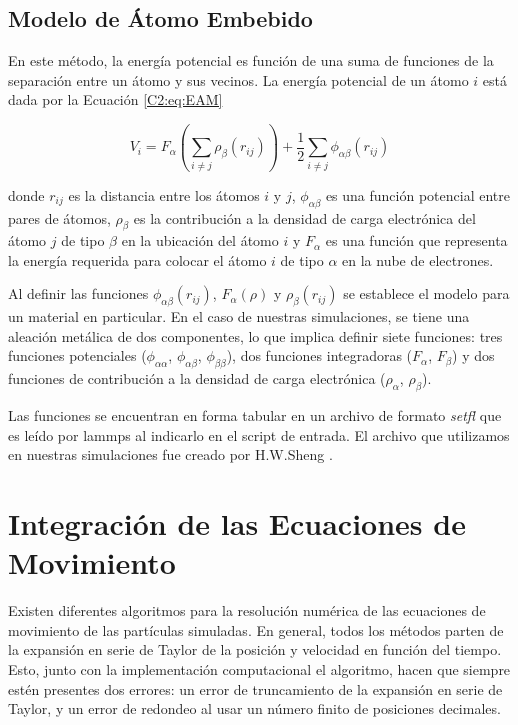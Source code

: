 \subsection{Modelo de Átomo Embebido}
\label{SS2_3_2}

En este método, la energía potencial es función de una suma de funciones de la separación entre un átomo y sus vecinos. La energía potencial de un átomo $i$ está dada por la Ecuación \ref{C2:eq:EAM}

\begin{equation}
V_{i} = F_{\alpha}\left(\sum_{i\neq j} \rho_{\beta} (r_{ij}) \right) + \frac{1}{2} \sum_{i\neq j} \phi_{\alpha\beta}(r_{ij})
\label{C2:eq:EAM}
\end{equation}

donde $r_{ij}$ es la distancia entre los átomos $i$ y $j$, $\phi_{\alpha\beta}$ es una función potencial entre pares de átomos, $\rho_{\beta}$ es la contribución a la densidad de carga electrónica del átomo $j$ de tipo $\beta$ en la ubicación del átomo $i$ y $F_{\alpha}$ es una función que representa la energía requerida para colocar el átomo $i$ de tipo $\alpha$ en la nube de electrones.

Al definir las funciones $\phi_{\alpha\beta}(r_{ij})$, $F_{\alpha}(\rho)$ y $\rho_{\beta} (r_{ij})$ se establece el modelo para un material en particular. En el caso de nuestras simulaciones, se tiene una aleación metálica de dos componentes, lo que implica definir siete funciones: tres funciones potenciales ($\phi_{\alpha\alpha}$, $\phi_{\alpha\beta}$, $\phi_{\beta\beta}$), dos funciones integradoras ($F_{\alpha}$, $F_{\beta}$) y dos funciones de contribución a la densidad de carga electrónica ($\rho_{\alpha}$, $\rho_{\beta}$).

Las funciones se encuentran en forma tabular en un archivo de formato \textit{setfl} \cite{setfl} que es leído por lammps al indicarlo en el script de entrada. El archivo que utilizamos en nuestras simulaciones fue creado por H.W.Sheng \cite{cheng09}.

\section{Integración de las Ecuaciones de Movimiento}
\label{S2_4}

Existen diferentes algoritmos para la resolución numérica de las ecuaciones de movimiento de las partículas simuladas. En general, todos los métodos parten de la expansión en serie de Taylor de la posición y velocidad en función del tiempo. Esto, junto con la implementación computacional el algoritmo, hacen que siempre estén presentes dos errores: un error de truncamiento de la expansión en serie de Taylor, y un error de redondeo al usar un número finito de posiciones decimales.

